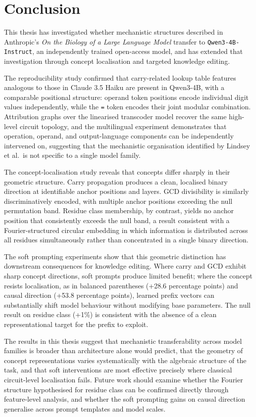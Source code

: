 \chapter{Conclusion}
\label{sec:conclusion}

This thesis has investigated whether mechanistic structures described in Anthropic's \textit{On the Biology of a Large Language Model} transfer to \texttt{Qwen3-4B-Instruct}, an independently trained open-access model, and has extended that investigation through concept localisation and targeted knowledge editing.

The reproducibility study confirmed that carry-related lookup table features analogous to those in Claude 3.5 Haiku are present in Qwen3-4B, with a comparable positional structure: operand token positions encode individual digit values independently, while the \texttt{=} token encodes their joint modular combination. Attribution graphs over the linearised transcoder model recover the same high-level circuit topology, and the multilingual experiment demonstrates that operation, operand, and output-language components can be independently intervened on, suggesting that the mechanistic organisation identified by Lindsey et al.\ is not specific to a single model family.

The concept-localisation study reveals that concepts differ sharply in their geometric structure. Carry propagation produces a clean, localised binary direction at identifiable anchor positions and layers. GCD divisibility is similarly discriminatively encoded, with multiple anchor positions exceeding the null permutation band. Residue class membership, by contrast, yields no anchor position that consistently exceeds the null band, a result consistent with a Fourier-structured circular embedding in which information is distributed across all residues simultaneously rather than concentrated in a single binary direction.

The soft prompting experiments show that this geometric distinction has downstream consequences for knowledge editing. Where carry and GCD exhibit sharp concept directions, soft prompts produce limited benefit; where the concept resists localisation, as in balanced parentheses (+28.6 percentage points) and causal direction (+53.8 percentage points), learned prefix vectors can substantially shift model behaviour without modifying base parameters. The null result on residue class (+1\%) is consistent with the absence of a clean representational target for the prefix to exploit.

The results in this thesis suggest that mechanistic transferability across model families is broader than architecture alone would predict, that the geometry of concept representations varies systematically with the algebraic structure of the task, and that soft interventions are most effective precisely where classical circuit-level localisation fails. Future work should examine whether the Fourier structure hypothesised for residue class can be confirmed directly through feature-level analysis, and whether the soft prompting gains on causal direction generalise across prompt templates and model scales.